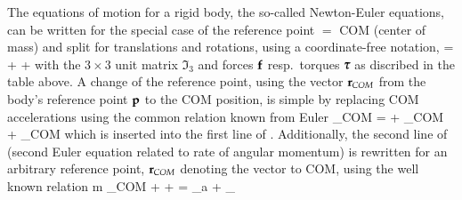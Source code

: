     The equations of motion for a rigid body, the so-called Newton-Euler equations, can be written for the special case of the reference point $=$ COM (center of mass) and split for translations and rotations, using a coordinate-free notation,
    \be \label{eq:ObjectRigidBody:EOMcom0}
        = \vp{\Null}{-\tilde \tomega \Jm \tomega} +  + \vp{\fv_\lambda}{\ttau_\lambda}
    \ee
    with the $3\times 3$ unit matrix $\Im_3$ and forces $\mathbf{f}$ resp.\ torques $\mbox{\boldmath $\tau$ \unboldmath}\!\!$ as discribed in the table above.
    A change of the reference point, using the vector $\mathbf{r}_{COM}$ from the body's reference point $\mathbf{p}$ to the COM position, is simple by replacing COM accelerations using the common relation known from Euler
    \be
      \av_{COM} =  \av + \tilde \talpha \rv_{COM} + \tilde \tomega \tilde \tomega \rv_{COM} \eqComma
    \ee
    which is inserted into the first line of . Additionally, the second line of 
    (second Euler equation related to rate of angular momentum) is rewritten for an arbitrary reference point, $\mathbf{r}_{COM}$ denoting the vector to COM, using the well known relation
    \be
      m \tilde \rv_{COM} \talpha +  \Jm \talpha + \tilde \tomega \Jm \tomega = \ttau_a + \ttau_\lambda
    \ee
    
